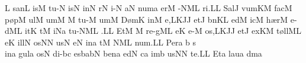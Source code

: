 \spatium
\custos L
\lineaproxima
\sgn san\punctum L\egn
{}is\punctum M\egn
\spatium
\sgn tu-\punctum N\egn
\sgn {}is\punctum N\egn
\spatium
\sgn {}in\punctum N\egn
\spatium
{}r\punctum N\egn
\sgn {}i-\punctum N\egn
\sgn {}a{}\punctum N\egn
\spatium
\sgn num\punctum a\egn
\sgn {}er\engl{}\punctum M\egn
\sgn {}{\a}-\climacus NML\egn
\sgn ri.\punctum L\augmentum L\egn
\spatium\divisiofinalis\spatium
\sgn Sal\punctum J\egn
\sgn vum\pes KM\egn
\spatium
\sgn fac\punctum M\egn
\spatium
\sgn p{\o}p\punctum M\egn
%
\sgn {}ul\punctum M\egn
\sgn {}um\punctum M\egn
\spatium
\custos M
\lineaproxima
\sgn tu-\punctum M\egn
\sgn {}um\punctum M\egn
\spatium
\sgn D{\o}m\punctum K\egn
\sgn {}in\punctum M\egn
\sgn {}e,\climacus LKJ\augmentum J\egn
\spatium\divisiominor\spatium
\sgn {}et\punctum J\egn
\spatium
\sgn b{\e}n\pes KL\egn
\sgn {}ed\punctum M\egn
\sgn {}ic\punctum M\egn
\spatium
\sgn h{\ae}r\punctum M\egn
\sgn {}e{-d}\clivis ML\egn
\sgn {}it\punctum K\egn
\sgn {}{\a}t\punctum M\egn
\sgn {}i{}\pes Na\egn
\spatium
\sgn tu-\climacus NML\egn
\sgn {}{\ae}.\punctum L\augmentum L\egn
\spatium\divisiofinalis\spatium
%
\sgn {}Et\punctum M\egn
\spatium
\custos M
\lineaproxima
\sgn re{-g}\clivis ML\egn
\sgn {}e{}\punctum K\egn
\spatium
\sgn {}e-\punctum M\egn
\sgn {}o{s,}\climacus LKJ\augmentum J\egn
\spatium\divisiominor\spatium
\sgn {}et\punctum J\egn
\spatium
\sgn {}ex\pes KM\egn
\sgn t{\o}{ll}\clivis ML\egn
\sgn {}e{}\punctum K\egn
\spatium
\sgn {}i{ll}\punctum N\egn
\sgn {}os\punctum N\augmentum N\egn
\spatium
\divisiominima
\spatium
\sgn {}us\punctum N\egn
{}e{}\punctum N\egn
\spatium
\sgn {}in\punctum a\egn
\spatium
\sgn {}{\ae}t\punctum M\egn
{}\climacus NML\egn
\sgn nu{m.}\punctum L\augmentum L\egn
\spatium
\divisiofinalis
\spatium
\sgn Per\punctum a\egn
\spatium
\custos b
\lineaproxima
\sgn s{\\i}n\punctum a\egn
\sgn gul\punctum a\egn
\sgn {}os\punctum N\egn
\spatium
\sgn di-\pes bc\egn
\sgn {}es\clivis ba\augmentumduplex bN\egn
\spatium\divisiominor\spatium
\sgn ben\punctum a\egn
\sgn {}e{d}\punctum N\egn
\sgn {}{\\i}c\punctum a\egn
\sgn {}im\punctum b\egn
\sgn {}us\punctum N\augmentum N\egn
\spatium
\sgn te.\punctum L\augmentum L\egn
\spatium\divisiofinalis\spatium
\sgn {}Et\punctum a\egn
\spatium\sgn lau\punctum a\egn
\sgn d{\a}m\punctum a\egn
